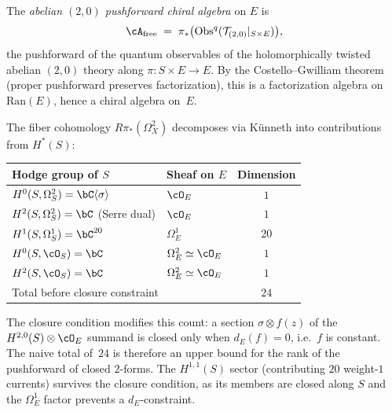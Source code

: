 \begin{construction}
\label{constr:pushforward-chiral-algebra}
The \emph{abelian $(2,0)$ pushforward chiral algebra} on $E$ is
\[
 \cA_{\mathrm{free}} \;=\; \pi_*\bigl(
 \mathrm{Obs}^q(\mathcal{T}_{(2,0)}|_{S \times E})\bigr),
\]
the pushforward of the quantum observables of the holomorphically
twisted abelian $(2,0)$ theory along $\pi \colon S \times E \to E$.
By the Costello--Gwilliam theorem (proper pushforward preserves
factorization), this is a factorization algebra on $\mathrm{Ran}(E)$,
hence a chiral algebra on~$E$.

The fiber cohomology $R\pi_*(\Omega^2_X)$ decomposes via
K\"unneth into contributions from $H^*(S)$:
\begin{center}
\small
\renewcommand{\arraystretch}{1.2}
\begin{tabular}{llc}
 \toprule
 \textbf{Hodge group of $S$} & \textbf{Sheaf on $E$}
 & \textbf{Dimension} \\
 \midrule
 $H^0(S, \Omega^2_S) = \bC\langle\sigma\rangle$
 & $\cO_E$ & $1$ \\
 $H^2(S, \Omega^2_S) = \bC$ (Serre dual)
 & $\cO_E$ & $1$ \\
 $H^1(S, \Omega^1_S) = \bC^{20}$
 & $\Omega^1_E$ & $20$ \\
 $H^0(S, \cO_S) = \bC$ & $\Omega^2_E \simeq \cO_E$ & $1$ \\
 $H^2(S, \cO_S) = \bC$ & $\Omega^2_E \simeq \cO_E$ & $1$ \\
 \midrule
 \multicolumn{2}{l}{Total before closure constraint} & $24$ \\
 \bottomrule
\end{tabular}
\end{center}
The closure condition modifies this count: a section
$\sigma \otimes f(z)$ of the $H^{2,0}(S) \otimes \cO_E$
summand is closed only when $d_E(f) = 0$, i.e.\ $f$ is constant.
The naive total of~$24$ is therefore an upper bound for the rank
of the pushforward of closed $2$-forms. The $H^{1,1}(S)$ sector
(contributing $20$ weight-$1$ currents) survives the closure
condition, as its members are closed along $S$ and the
$\Omega^1_E$ factor prevents a $d_E$-constraint.
\end{construction}

